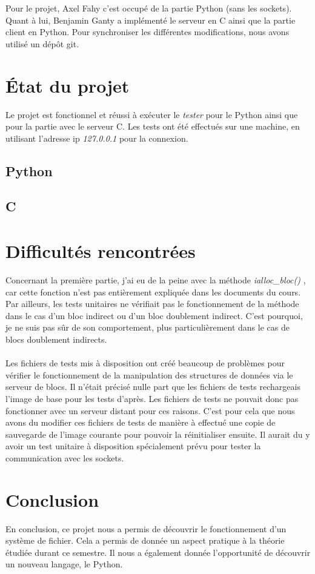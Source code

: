 \documentclass[12pt]{article}
\begin{document}
Pour le projet, Axel Fahy c'est occupé de la partie Python (sans les sockets).
\\
Quant à lui, Benjamin Ganty a implémenté le serveur en C ainsi que la partie client en 
Python.
Pour synchroniser les différentes modifications, nous avons utilisé un dépôt git.


\section{État du projet}
Le projet est fonctionnel et réussi à exécuter le \textit{tester} pour le Python ainsi
que pour la partie avec le serveur C. 
Les tests ont été effectués sur une machine, en utilisant l'adresse ip \textit{127.0.0.1} 
pour la connexion.

  \subsection{Python}

  \subsection{C}


\section{Difficultés rencontrées}

Concernant la première partie, j'ai eu de la peine avec la méthode \textit{ialloc\_bloc()}
, car cette fonction n'est pas entièrement expliquée dans les documents du cours. 
Par ailleurs, les tests unitaires ne vérifiait pas le fonctionnement de la méthode 
dans le cas d'un bloc indirect ou d'un bloc doublement indirect.
C'est pourquoi, je ne suis pas sûr de son comportement, plus particulièrement dans 
le cas de blocs doublement indirects.
\\\\
Les fichiers de tests mis à disposition ont créé beaucoup de problèmes pour
vérifier le fonctionnement de la manipulation des structures de données via
le serveur de blocs. Il n'était précisé nulle part que les fichiers de tests
rechargeais l'image de base pour les tests d'après. Les fichiers de tests ne pouvait
donc pas fonctionner avec un serveur distant pour ces raisons. C'est pour cela
que nous avons du modifier ces fichiers de tests de manière à effectué une copie
de sauvegarde de l'image courante pour pouvoir la réinitialiser ensuite.
Il aurait du y avoir un test unitaire à disposition spécialement prévu pour 
tester la communication avec les sockets.


\section{Conclusion}

En conclusion, ce projet nous a permis de découvrir le fonctionnement d'un système
de fichier. Cela a permis de donnée un aspect pratique à la théorie étudiée 
durant ce semestre. Il nous a également donnée l'opportunité de découvrir un
nouveau langage, le Python.
\end{document}
